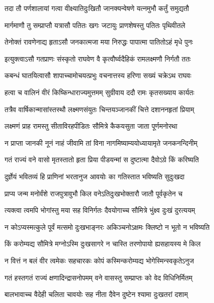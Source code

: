 \twolineshloka
{तदा तौ पर्णशालायां गत्वा वीक्ष्यातिदुःखितौ}
{जानक्यन्वेषणे यत्‍नमुभौ कर्तुं समुद्यतौ}%

\twolineshloka
{मार्गमाणौ तु सम्प्राप्तौ यत्रासौ पतितः खगः}
{जटायुः प्राणशेषस्तु पतितः पृथिवीतले}%

\twolineshloka
{तेनोक्तं रावणेनाद्य हृता‍‍ऽसौ जनकात्मजा}
{मया निरुद्धः पापात्मा पातितोऽहं मृधे पुनः}%

\twolineshloka
{इत्युक्त्वाऽसौ गतप्राणः संस्कृतो राघवेण वै}
{कृत्वौर्घ्वदैहिकं रामलक्ष्मणौ निर्गतौ ततः}%

\twolineshloka
{कबन्धं घातयित्वासौ शापाच्चामोचयत्प्रभुः}
{वचनात्तस्य हरिणा सख्यं चक्रेऽथ राघवः}%

\twolineshloka
{हत्वा च वालिनं वीरं किष्किन्धाराज्यमुत्तमम्}
{सुग्रीवाय ददौ रामः कृतसख्याय कार्यतः}%

\twolineshloka
{तत्रैव वार्षिकान्मासांस्तस्थौ लक्ष्मणसंयुतः}
{चिन्तयञ्जानकीं चित्ते दशाननहृतां प्रियाम्}%

\twolineshloka
{लक्ष्मणं प्राह रामस्तु सीताविरहपीडितः}
{सौ‌मित्रे कैकयसुता जाता पूर्णमनोरथा}%

\twolineshloka
{न प्राप्ता जानकी नूनं नाहं जीवामि तां विना}
{नागमिष्याम्ययोध्यायामृते जनकनन्दिनीम्}%

\twolineshloka
{गतं राज्यं वने वासो मृतस्तातो हृता प्रिया}
{पीडयन्मां स दुष्टात्मा दैवो‍ऽग्रे किं करिष्यति}%

\twolineshloka
{दुर्ज्ञेयं भवितव्यं हि प्राणिनां भरतानुज}
{आवयोः का गतिस्तात भविष्यति सुदुःखदा}%

\twolineshloka
{प्राप्य जन्म मनोर्वंशे राजपुत्रावुभौ किल}
{वनेऽतिदुःखभोक्तारौ जातौ पूर्वकृतेन च}%

\twolineshloka
{त्यक्त्वा त्वमपि भोगांस्तु मया सह विनिर्गतः}
{दैवयोगाच्च सौ‌मित्रे भुंक्ष्व दुःखं दुरत्ययम्}%

\twolineshloka
{न कोऽप्यस्मत्कुले पूर्वं मत्समो दुःखभाङ्नरः}
{अकिञ्चनोऽक्षमः क्लिष्टो न भूतो न भविष्यति}%

\twolineshloka
{किं करोम्यद्य सौ‌मित्रे मग्नोऽस्मि दुःखसागरे}
{न चास्ति तरणोपायो ह्यसहायस्य मे किल}%

\twolineshloka
{न वित्तं न बलं वीर त्वमेकः सहचारकः}
{कोपं कस्मिन्करोम्यद्य भोगेस्मिन्स्वकृतेऽनुज}%

\twolineshloka
{गतं हस्तगतं राज्यं क्षणादिन्द्रासनोपमम्}
{वने वासस्तु सम्प्राप्तः को वेद विधिनिर्मितम्}%

\twolineshloka
{बालभावाच्च वैदेही चलिता चावयोः सह}
{नीता दैवेन दुष्टेन श्यामा दुःखतरां दशाम्}%

